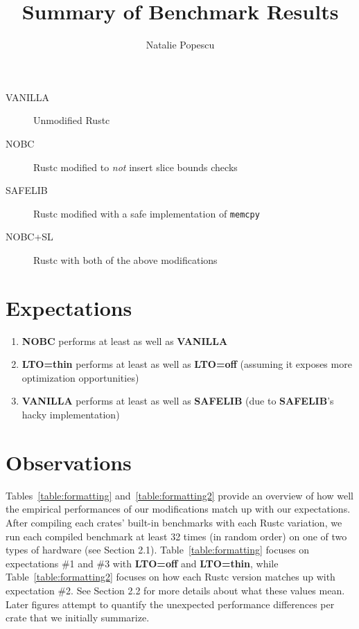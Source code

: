 \documentclass{article}
\begin{document}
\title{Summary of Benchmark Results}
\date{}
\author{Natalie Popescu}
\maketitle


\begin{description}

\item[VANILLA] Unmodified Rustc

\item[NOBC] Rustc modified to \textit{not} insert slice bounds checks

\item[SAFELIB] Rustc modified with a safe implementation of \texttt{memcpy}

\item[NOBC+SL] Rustc with both of the above modifications

\end{description}


\section{Expectations}


\begin{enumerate}

\item \textbf{NOBC} performs at least as well as \textbf{VANILLA}

\item \textbf{LTO=thin} performs at least as well as \textbf{LTO=off} (assuming it exposes more optimization opportunities)

\item \textbf{VANILLA} performs at least as well as \textbf{SAFELIB}  (due to \textbf{SAFELIB}'s hacky implementation)

\end{enumerate}


\section{Observations}


Tables~\ref{table:formatting} and~\ref{table:formatting2} provide an overview of how well the empirical performances of our modifications match up with our expectations. 
%
After compiling each crates' built-in benchmarks with each Rustc variation, we run each compiled benchmark at least 32 times (in random order) on one of two types of hardware (see Section 2.1). 
%
Table~\ref{table:formatting} focuses on expectations \#1 and \#3 with \textbf{LTO=off} and \textbf{LTO=thin}, while Table~\ref{table:formatting2} focuses on how each Rustc version matches up with expectation \#2. %
%
See Section 2.2 for more details about what these values mean. 
%
Later figures attempt to quantify the unexpected performance differences per crate that we initially summarize. 
\end{document}
